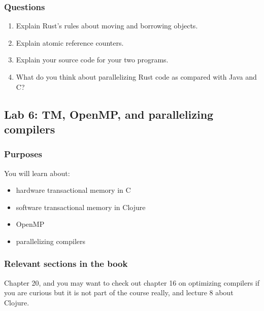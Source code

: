 \documentclass{forsete}
\begin{document}
\subsubsection*{Questions}
\begin{enumerate}
\item Explain Rust's rules about moving and borrowing objects.
\item Explain atomic reference counters.
\item Explain your source code for your two programs.
\item What do you think about parallelizing Rust code as compared with Java and C?
\end{enumerate}
\newpage
\subsection*{Lab 6: TM, OpenMP, and parallelizing compilers}
\subsubsection*{Purposes}
You will learn about:
\begin{itemize}
\item hardware transactional memory in C
\item software transactional memory in Clojure
\item OpenMP
\item parallelizing compilers
\end{itemize}

\subsubsection*{Relevant sections in the book}
Chapter 20, and you may want to check out chapter 16 on optimizing compilers if you are curious but it is
not part of the course really, and lecture 8 about Clojure.
\end{document}
